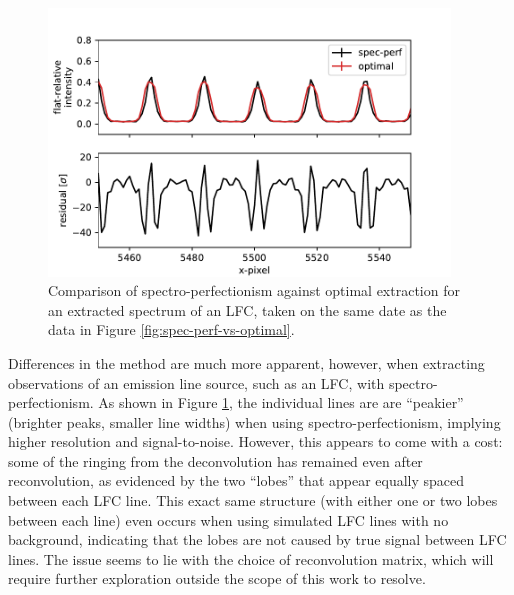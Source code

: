 \begin{figure}
    \centering
    \includegraphics[width=0.95\textwidth]{figures-5/spec-perf-vs-optimal-lfc.pdf}
    \caption[Spectro-perfectionism vs. optimal extraction -- Laser frequency comb]{Comparison of spectro-perfectionism against optimal extraction for an extracted spectrum of an LFC, taken on the same date as the data in Figure \ref{fig:spec-perf-vs-optimal}.}
    \label{fig:spec-perf-vs-optimal-lfc}
\end{figure}

Differences in the method are much more apparent, however, when extracting observations of an emission line source, such as an LFC, with spectro-perfectionism. As shown in Figure \ref{fig:spec-perf-vs-optimal-lfc}, the individual lines are are ``peakier'' (brighter peaks, smaller line widths) when using spectro-perfectionism, implying higher resolution and signal-to-noise. However, this appears to come with a cost: some of the ringing from the deconvolution has remained even after reconvolution, as evidenced by the two ``lobes'' that appear equally spaced between each LFC line. This exact same structure (with either one or two lobes between each line) even occurs when using simulated LFC lines with no background, indicating that the lobes are not caused by true signal between LFC lines. The issue seems to lie with the choice of reconvolution matrix, which will require further exploration outside the scope of this work to resolve.

